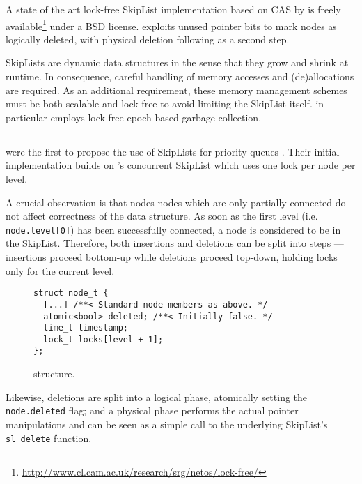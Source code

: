 \documentclass[a4paper,10pt]{article}
\begin{document}
A state of the art lock-free SkipList implementation based on \ac{CAS}
by \citeauthor{fraser2004practical} \cite{fraser2004practical} is freely available\footnote{
\url{http://www.cl.cam.ac.uk/research/srg/netos/lock-free/}} under a BSD license.
\citeauthor{fraser2004practical} exploits unused pointer bits to mark nodes as logically
deleted, with physical deletion following as a second step.

SkipLists are dynamic data structures in the sense that they grow and shrink
at runtime. In consequence, careful handling of memory accesses and (de)allocations
are required. As an additional requirement, these memory management schemes must
be both scalable and lock-free to avoid limiting the SkipList itself.
\citeauthor{fraser2004practical} in particular employs lock-free epoch-based garbage-collection.

\subsection{\citeauthor{shavit2000skiplist}} \label{sec:shavit}

\citeauthor{shavit2000skiplist} were the first to propose the use of SkipLists
for priority queues \cite{linden2013skiplist}. Their initial implementation
\cite{shavit2000skiplist} builds on \citeauthor{pugh1998concurrent}'s concurrent
SkipList \cite{pugh1998concurrent} which uses one lock per node per level.


A crucial observation is that nodes nodes which are only partially connected
do not affect correctness of the data structure. As soon as the first level (i.e. \lstinline|node.level[0]|)
has been successfully connected, a node is considered to be in the SkipList.
Therefore, both insertions and deletions can be split into steps --- insertions
proceed bottom-up while deletions proceed top-down, holding locks only for the current level.

\begin{figure}[h]
\begin{lstlisting}
struct node_t {
  [...] /**< Standard node members as above. */
  atomic<bool> deleted; /**< Initially false. */
  time_t timestamp;
  lock_t locks[level + 1];
};
\end{lstlisting}
\caption{\citeauthor{shavit2000skiplist} structure.}
\label{fig:shavitsl}
\end{figure}

Likewise, deletions are split into a logical phase, atomically setting the \lstinline|node.deleted|
flag; and a physical phase performs the actual pointer manipulations and can be seen as a simple
call to the underlying SkipList's \lstinline|sl_delete| function.
\end{document}
